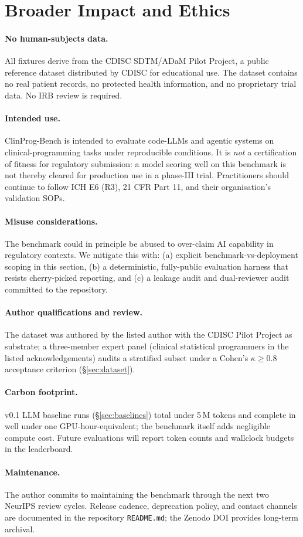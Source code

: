 \section{Broader Impact and Ethics}
\label{sec:ethics}

\paragraph{No human-subjects data.} All fixtures derive from the CDISC
SDTM/ADaM Pilot Project, a public reference dataset distributed by CDISC for
educational use. The dataset contains no real patient records, no protected
health information, and no proprietary trial data. No IRB review is required.

\paragraph{Intended use.} ClinProg-Bench is intended to evaluate code-LLMs
and agentic systems on clinical-programming tasks under reproducible
conditions. It is \emph{not} a certification of fitness for regulatory
submission: a model scoring well on this benchmark is not thereby cleared
for production use in a phase-III trial. Practitioners should continue to
follow ICH E6 (R3), 21 CFR Part 11, and their organisation's validation
SOPs.

\paragraph{Misuse considerations.} The benchmark could in principle be
abused to over-claim AI capability in regulatory contexts. We mitigate this
with: (a) explicit benchmark-vs-deployment scoping in this section,
(b) a deterministic, fully-public evaluation harness that resists cherry-picked
reporting, and (c) a leakage audit and dual-reviewer audit committed to the
repository.

\paragraph{Author qualifications and review.} The dataset was authored by
the listed author with the CDISC Pilot Project as substrate; a three-member
expert panel (clinical statistical programmers in the listed acknowledgements)
audits a stratified subset under a Cohen's $\kappa \geq 0.8$ acceptance
criterion (\S\ref{sec:dataset}).

\paragraph{Carbon footprint.} v0.1 LLM baseline runs (\S\ref{sec:baselines})
total under 5\,M tokens and complete in well under one GPU-hour-equivalent;
the benchmark itself adds negligible compute cost. Future evaluations will
report token counts and wallclock budgets in the leaderboard.

\paragraph{Maintenance.} The author commits to maintaining the benchmark
through the next two NeurIPS review cycles. Release cadence, deprecation
policy, and contact channels are documented in the repository
\texttt{README.md}; the Zenodo DOI provides long-term archival.

